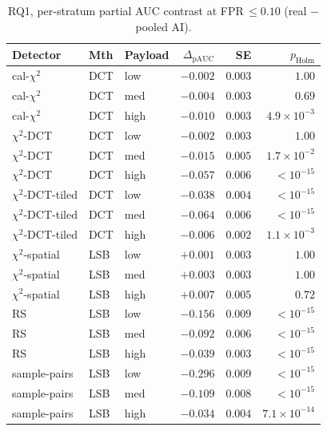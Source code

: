 \documentclass[10pt,twocolumn,a4paper]{article}
\begin{document}
\begin{table}[!htbp]
\centering\footnotesize
\caption{RQ1, per-stratum partial AUC contrast at FPR\,$\leq\!0.10$ (real $-$ pooled AI).}
\label{tab:appendix-pauc}
\setlength{\tabcolsep}{4pt}\renewcommand{\arraystretch}{1.1}
\begin{tabular}{@{}l l l r r r@{}}
\toprule
\textbf{Detector} & \textbf{Mth} & \textbf{Payload} & \textbf{$\Delta_\text{pAUC}$} & \textbf{SE} & \textbf{$p_\text{Holm}$} \\
\midrule
cal-$\chi^2$         & DCT & low    & $-0.002$ & $0.003$ & $1.00$ \\
cal-$\chi^2$         & DCT & med    & $-0.004$ & $0.003$ & $0.69$ \\
cal-$\chi^2$         & DCT & high   & $-0.010$ & $0.003$ & $4.9\!\times\!10^{-3}$ \\
$\chi^2$-DCT         & DCT & low    & $-0.002$ & $0.003$ & $1.00$ \\
$\chi^2$-DCT         & DCT & med    & $-0.015$ & $0.005$ & $1.7\!\times\!10^{-2}$ \\
$\chi^2$-DCT         & DCT & high   & $-0.057$ & $0.006$ & $<\!10^{-15}$ \\
$\chi^2$-DCT-tiled   & DCT & low    & $-0.038$ & $0.004$ & $<\!10^{-15}$ \\
$\chi^2$-DCT-tiled   & DCT & med    & $-0.064$ & $0.006$ & $<\!10^{-15}$ \\
$\chi^2$-DCT-tiled   & DCT & high   & $-0.006$ & $0.002$ & $1.1\!\times\!10^{-3}$ \\
$\chi^2$-spatial     & LSB & low    & $+0.001$ & $0.003$ & $1.00$ \\
$\chi^2$-spatial     & LSB & med    & $+0.003$ & $0.003$ & $1.00$ \\
$\chi^2$-spatial     & LSB & high   & $+0.007$ & $0.005$ & $0.72$ \\
RS                   & LSB & low    & $-0.156$ & $0.009$ & $<\!10^{-15}$ \\
RS                   & LSB & med    & $-0.092$ & $0.006$ & $<\!10^{-15}$ \\
RS                   & LSB & high   & $-0.039$ & $0.003$ & $<\!10^{-15}$ \\
sample-pairs         & LSB & low    & $-0.296$ & $0.009$ & $<\!10^{-15}$ \\
sample-pairs         & LSB & med    & $-0.109$ & $0.008$ & $<\!10^{-15}$ \\
sample-pairs         & LSB & high   & $-0.034$ & $0.004$ & $7.1\!\times\!10^{-14}$ \\
\bottomrule
\end{tabular}
\end{table}
\end{document}
